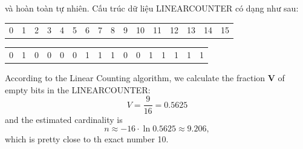 \documentclass[a4paper,13pt]{article}
\theoremstyle{mytheor}
\begin{document}
\begin{mdframed}
và hoàn toàn tự nhiên. Cấu trúc dữ liệu LINEARCOUNTER có dạng như sau:
\begin{center}
    \begin{tabular}{p{0.4cm}p{0.4cm}p{0.4cm}p{0.4cm}p{0.4cm}p{0.4cm}p{0.4cm}p{0.4cm}p{0.4cm}p{0.4cm}p{0.4cm}p{0.4cm}p{0.4cm}p{0.4cm}p{0.4cm}p{0.4cm}}
        0 & 1 & 2 & 3 & 4 & 5 & 6 & 7 & 8 & 9 & 10 & 11 & 12 & 13 & 14 & 15 %
    \end{tabular}
    \begin{tabular}{|p{0.4cm}|p{0.4cm}|p{0.4cm}|p{0.4cm}|p{0.4cm}|p{0.4cm}|p{0.4cm}|p{0.4cm}|p{0.4cm}|p{0.4cm}|p{0.4cm}|p{0.4cm}|p{0.4cm}|p{0.4cm}|p{0.4cm}|p{0.4cm}|}
        \hline
        0 & 1 & 0 & 0 & 0 & 0 & 1 & 1 & 1 & 0 & 0 & 1 & 1 & 1 & 1 & 1 \\ \cline{1-16} %
    \end{tabular}
\end{center}
\vspace{0.2cm}
According to the Linear Counting algorithm, we calculate the fraction \textbf{V}
of empty bits in the LINEARCOUNTER:
\begin{equation}
    V = \frac{9}{16} = 0.5625
\end{equation}
and the estimated cardinality is
\begin{equation}
    n \approx -16\cdot \ln 0.5625 \approx 9.206,
\end{equation}
which is pretty close to th exact number 10.
\end{mdframed}
\end{document}
